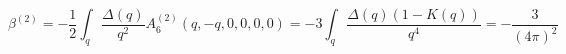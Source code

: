 \begin{equation}
\beta^{(2)} = - \frac{1}{2} \int_q \frac{\Delta (q)}{q^2} A_6^{(2)}
(q,-q,0,0,0,0) = - 3 \int_q \frac{\Delta (q) (1 - K(q))}{q^4} = -
\frac{3}{(4\pi)^2} 
\end{equation}

